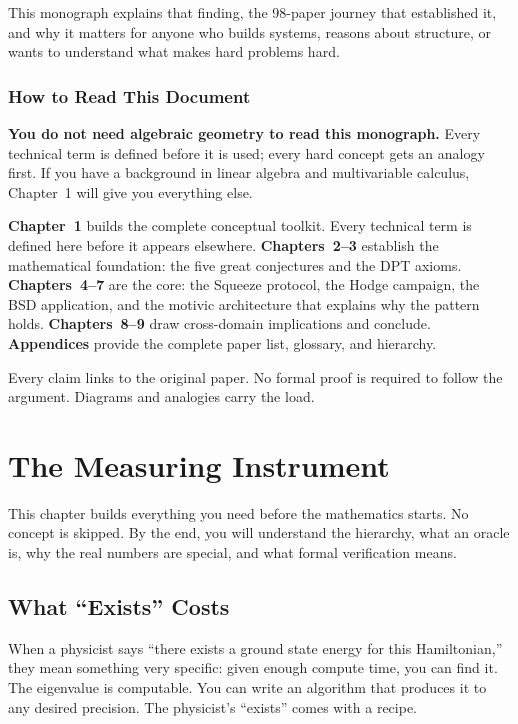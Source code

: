\documentclass[11pt,twoside,openany]{report}
\theoremstyle{remark}
\begin{document}
This monograph explains that finding, the 98-paper journey that established it, and why it matters for anyone who builds systems, reasons about structure, or wants to understand what makes hard problems hard.

\subsection*{How to Read This Document}

\textbf{You do not need algebraic geometry to read this monograph.} Every technical term is defined before it is used; every hard concept gets an analogy first. If you have a background in linear algebra and multivariable calculus, Chapter~1 will give you everything else.

\textbf{Chapter~1} builds the complete conceptual toolkit. Every technical term is defined here before it appears elsewhere.
\textbf{Chapters~2--3} establish the mathematical foundation: the five great conjectures and the DPT axioms.
\textbf{Chapters~4--7} are the core: the Squeeze protocol, the Hodge campaign, the BSD application, and the motivic architecture that explains why the pattern holds.
\textbf{Chapters~8--9} draw cross-domain implications and conclude.
\textbf{Appendices} provide the complete paper list, glossary, and hierarchy.

Every claim links to the original paper. No formal proof is required to follow the argument. Diagrams and analogies carry the load.


\chapter{The Measuring Instrument}

This chapter builds everything you need before the mathematics starts. No concept is skipped. By the end, you will understand the hierarchy, what an oracle is, why the real numbers are special, and what formal verification means.

\section{What ``Exists'' Costs}

When a physicist says ``there exists a ground state energy for this Hamiltonian,'' they mean something very specific: given enough compute time, you can find it. The eigenvalue is computable. You can write an algorithm that produces it to any desired precision. The physicist's ``exists'' comes with a recipe.
\end{document}
